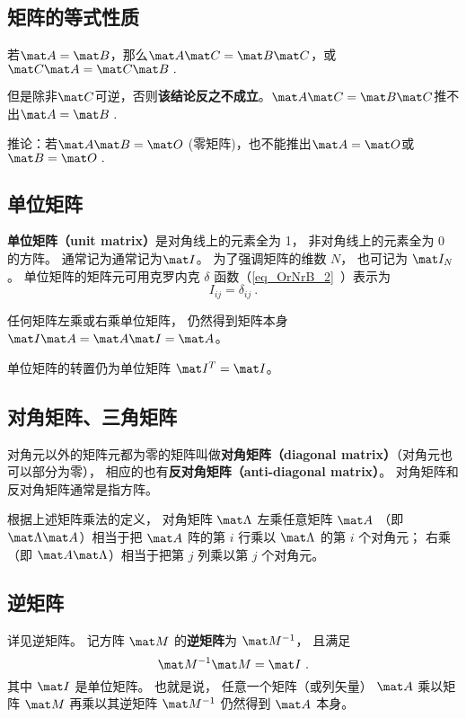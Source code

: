 \subsection{矩阵的等式性质}
若$\mat A=\mat B$，那么$\mat A \mat C = \mat B \mat C$，或$\mat C \mat A = \mat C \mat B~.$

但是除非$\mat C$可逆，否则\textbf{该结论反之不成立}。$\mat A \mat C = \mat B \mat C$推不出$\mat A = \mat B~.$

推论：若$\mat A \mat B= \mat O$ (零矩阵)，也不能推出$\mat A = \mat O$或$\mat B = \mat O~.$

\subsection{单位矩阵}
\textbf{单位矩阵（unit matrix）}是对角线上的元素全为 1， 非对角线上的元素全为 0 的方阵。 通常记为通常记为$\mat I$。 为了强调矩阵的维数 $N$， 也可记为 $\mat I_N$。 单位矩阵的矩阵元可用克罗内克 $\delta$ 函数（\autoref{eq_OrNrB_2}~）表示为
\begin{equation}
I_{ij} = \delta_{ij}~.
\end{equation} 

任何矩阵左乘或右乘单位矩阵， 仍然得到矩阵本身$\mat I \mat A = \mat A \mat I = \mat A$。 

单位矩阵的转置仍为单位矩阵 $\mat I^T = \mat I$。

\subsection{对角矩阵、三角矩阵}
对角元以外的矩阵元都为零的矩阵叫做\textbf{对角矩阵（diagonal matrix）}（对角元也可以部分为零）， 相应的也有\textbf{反对角矩阵（anti-diagonal matrix）}。 对角矩阵和反对角矩阵通常是指方阵。

根据上述矩阵乘法的定义， 对角矩阵 $\mat\Lambda$ 左乘任意矩阵 $\mat A$ （即 $\mat\Lambda\mat A$）相当于把 $\mat A$ 阵的第 $i$ 行乘以 $\mat\Lambda$ 的第 $i$ 个对角元； 右乘（即 $\mat A\mat\Lambda$）相当于把第 $j$ 列乘以第 $j$ 个对角元。

\subsection{逆矩阵}
详见逆矩阵。 记方阵 $\mat M$ 的\textbf{逆矩阵}为 $\mat M^{-1}$， 且满足
\begin{equation}
\mat M^{-1} \mat M = \mat I~.
\end{equation}
其中 $\mat I$ 是单位矩阵。 也就是说， 任意一个矩阵（或列矢量） $\mat A$ 乘以矩阵 $\mat M$ 再乘以其逆矩阵 $\mat M^{-1}$ 仍然得到 $\mat A$ 本身。

